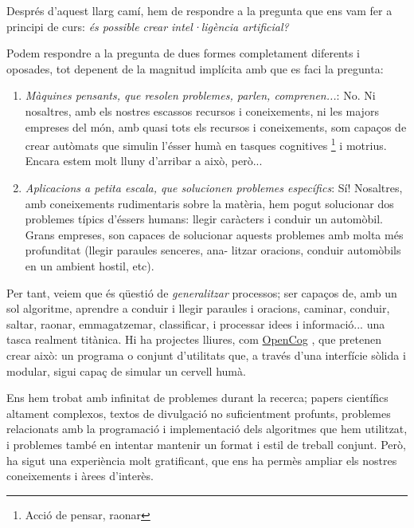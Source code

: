 Després d'aquest llarg camí, hem de respondre a la pregunta que ens vam fer a principi de curs:
\emph{és possible crear intel·ligència artificial?}

Podem respondre a la pregunta de dues formes completament diferents i oposades, tot depenent
de la magnitud implícita amb que es faci la pregunta:
\begin{enumerate}
\item \emph{Màquines pensants, que resolen problemes, parlen, comprenen...}: No. Ni nosaltres,
amb els nostres escassos recursos i coneixements, ni les majors empreses del món, amb quasi tots
els recursos i coneixements, som capaços de crear autòmats que simulin l'ésser humà en tasques
cognitives \footnote{Acció de pensar, raonar} i motrius. Encara estem molt lluny d'arribar a això, però...
\item \emph{Aplicacions a petita escala, que solucionen problemes específics}: Sí! Nosaltres,
amb coneixements rudimentaris sobre la matèria, hem pogut solucionar dos problemes típics d'éssers humans:
llegir caràcters i conduir un automòbil. Grans empreses, son capaces de solucionar aquests problemes amb
molta més profunditat (llegir paraules senceres, ana- litzar oracions, conduir automòbils en un ambient hostil, etc).
\end{enumerate}

Per tant, veiem que és qüestió de \emph{generalitzar} processos; ser capaços de, amb un sol algoritme,
aprendre a conduir i llegir paraules i oracions, caminar, conduir, saltar, raonar, emmagatzemar, classificar,
i processar idees i informació... una tasca realment titànica. Hi ha projectes lliures, com \href{http://opencog.org/}{OpenCog}
, que
pretenen crear això: un programa o conjunt d'utilitats que, a través d'una interfície sòlida i modular, sigui
capaç de simular un cervell humà.

Ens hem trobat amb infinitat de problemes durant la recerca; papers científics altament complexos,
textos de divulgació no suficientment profunts, problemes relacionats amb la programació i implementació
dels algoritmes que hem utilitzat, i problemes també en intentar mantenir un format i estil de treball
conjunt. Però, ha sigut una experiència molt gratificant, que ens ha permès ampliar els nostres coneixements
i àrees d'interès.
